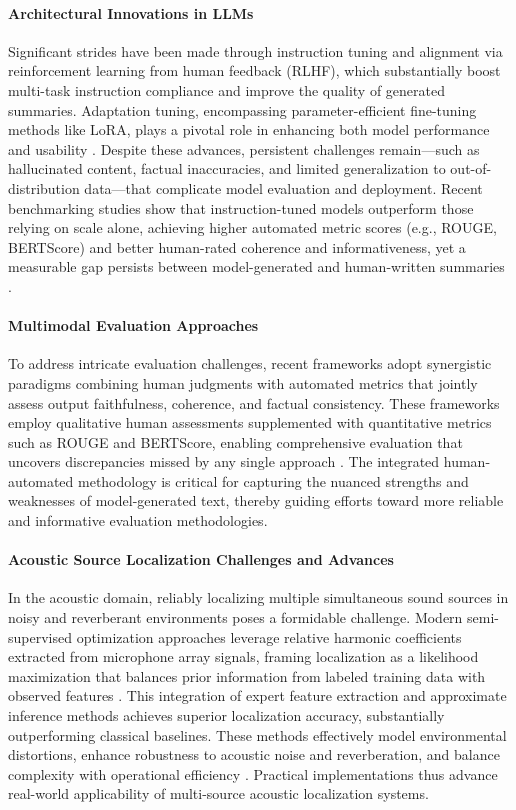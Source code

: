 \documentclass[sigconf]{acmart}
\begin{document}
\paragraph{Architectural Innovations in LLMs}  
Significant strides have been made through instruction tuning and alignment via reinforcement learning from human feedback (RLHF), which substantially boost multi-task instruction compliance and improve the quality of generated summaries. Adaptation tuning, encompassing parameter-efficient fine-tuning methods like LoRA, plays a pivotal role in enhancing both model performance and usability \cite{ref10,ref52}. Despite these advances, persistent challenges remain—such as hallucinated content, factual inaccuracies, and limited generalization to out-of-distribution data—that complicate model evaluation and deployment. Recent benchmarking studies show that instruction-tuned models outperform those relying on scale alone, achieving higher automated metric scores (e.g., ROUGE, BERTScore) and better human-rated coherence and informativeness, yet a measurable gap persists between model-generated and human-written summaries \cite{ref1}.

\paragraph{Multimodal Evaluation Approaches}  
To address intricate evaluation challenges, recent frameworks adopt synergistic paradigms combining human judgments with automated metrics that jointly assess output faithfulness, coherence, and factual consistency. These frameworks employ qualitative human assessments supplemented with quantitative metrics such as ROUGE and BERTScore, enabling comprehensive evaluation that uncovers discrepancies missed by any single approach \cite{ref10,ref51}. The integrated human-automated methodology is critical for capturing the nuanced strengths and weaknesses of model-generated text, thereby guiding efforts toward more reliable and informative evaluation methodologies.

\paragraph{Acoustic Source Localization Challenges and Advances}  
In the acoustic domain, reliably localizing multiple simultaneous sound sources in noisy and reverberant environments poses a formidable challenge. Modern semi-supervised optimization approaches leverage relative harmonic coefficients extracted from microphone array signals, framing localization as a likelihood maximization that balances prior information from labeled training data with observed features \cite{ref52}. This integration of expert feature extraction and approximate inference methods achieves superior localization accuracy, substantially outperforming classical baselines. These methods effectively model environmental distortions, enhance robustness to acoustic noise and reverberation, and balance complexity with operational efficiency \cite{ref1,ref2,ref3,ref26}. Practical implementations thus advance real-world applicability of multi-source acoustic localization systems.
\end{document}
